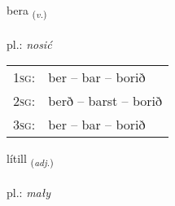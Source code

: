 \documentclass[frontgrid, backgrid]{flacards}\usepackage[]{graphicx}\usepackage[]{xcolor}
\begin{document}
\renewcommand{\blhead}{\vskip5pt {\small\bfseries\footnotesize Sagnorð | czasownik }}
\renewcommand{\bcfoot}{\vskip5pt \hspace{2pt}{\small\bfseries\footnotesize 1K}}


{bera \small{\textsubscript{(\textit{v.})}} \\[1ex] %
\textphonetic{[pɛːra]} \\
pl.: \emph{nosić} \\  [2ex]
\renewcommand*{\arraystretch}{0.8}
\begin{tabular}{p{1cm}l}
\textsc{1sg}: & ber -- bar -- borið \\ 
\textsc{2sg}: & berð -- barst -- borið \\ 
\textsc{3sg}: & ber -- bar -- borið \\ 
\end{tabular}
}

\renewcommand{\flhead}{\vskip5pt \fboxsep=0pt {\small\bfseries\footnotesize Lýsingarorð | przymiotnik}}
\renewcommand{\fcfoot}{\vskip5pt \fboxsep=0pt \hspace{2pt}{\small\bfseries\footnotesize 1K}}

\renewcommand{\blhead}{\vskip5pt {\small\bfseries\footnotesize Lýsingarorð | przymiotnik }}
\renewcommand{\bcfoot}{\vskip5pt \hspace{2pt}{\small\bfseries\footnotesize 1K}}


{lítill \small{\textsubscript{(\textit{adj.})}} \\[1ex] %
\textphonetic{[liːtɪtl̥]} \\
pl.: \emph{mały} \\  [2ex]
\renewcommand*{\arraystretch}{0.8}
}
\end{document}
